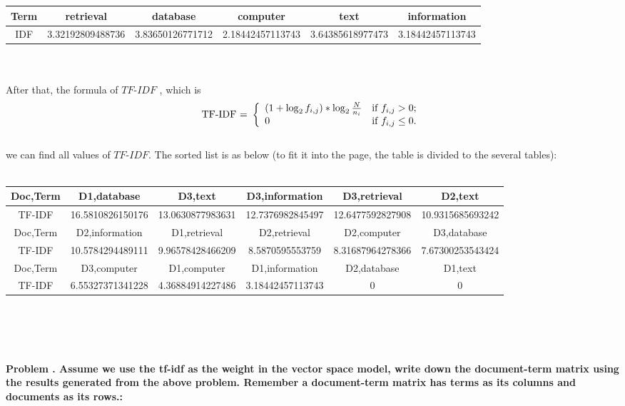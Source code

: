 \documentclass[paper=8.27in:11.69in, 14pt, DIV=calc]{scrartcl}
\newcounter{numbers}
\newcommand\printnumbers{\refstepcounter{numbers}\thenumbers}
\begin{document}
\begin{tabular}{|c|c|c|c|c|c|}
\hline
Term & retrieval & database & computer & text & information \\ \hline
IDF  & 3.32192809488736 & 3.83650126771712 & 2.18442457113743 & 3.64385618977473 & 3.18442457113743  \\ \hline
\end{tabular}
\\
\\
After that, the formula of $TF$-$IDF$ , which is
\\
\[ \text{TF-IDF = } \left\{ \begin{array}{ll}
(1 + \log_{2} f_{i,j})  * \log_{2} \frac{N}{ n_{i} } & \mbox{if $f_{i,j} > 0$};\\
$0$ & \mbox{if $f_{i,j} \leq 0$}.\end{array} \right. \]\\
we can find all values of $TF$-$IDF$. The sorted list is as below (to fit it into the page, the table is divided to the several tables):
\\
\\
\begin{tabular}{|c|c|c|c|c|c|}
\hline
Doc,Term & D1,database      & D3,text          & D3,information   & D3,retrieval     & D2,text          \\ \hline
TF-IDF   & 16.5810826150176 & 13.0630877983631 & 12.7376982845497 & 12.6477592827908 & 10.9315685693242 \\ \hline
Doc,Term & D2,information   & D1,retrieval     & D2,retrieval     & D2,computer      & D3,database      \\ \hline
TF-IDF   & 10.5784294489111 & 9.96578428466209 & 8.5870595553759  & 8.31687964278366 & 7.67300253543424 \\ \hline
Doc,Term & D3,computer      & D1,computer      & D1,information   & D2,database      & D1,text          \\ \hline
TF-IDF   & 6.55327371341228 & 4.36884914227486 & 3.18442457113743 & 0                & 0                \\ \hline
\end{tabular}
\\
\\
\\
\\
\textbf{Problem \printnumbers . Assume we use the tf-idf as the weight in the vector space model, write down the document-term matrix  using the results generated from the above problem.  Remember a document-term matrix has terms as its columns and documents  as its rows.:}
\\
\end{document}
